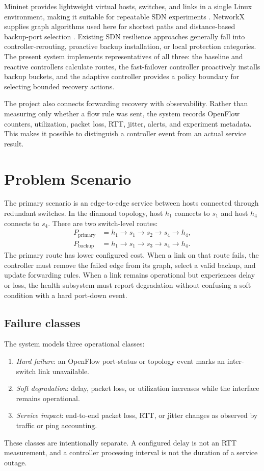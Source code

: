 \documentclass[conference]{IEEEtran}
\begin{document}
Mininet provides lightweight virtual hosts, switches, and links in a single
Linux environment, making it suitable for repeatable SDN experiments
\cite{lantz2010}. NetworkX supplies graph algorithms used here for shortest
paths and distance-based backup-port selection \cite{networkx}. Existing SDN
resilience approaches generally fall into controller-rerouting, proactive
backup installation, or local protection categories. The present system
implements representatives of all three: the baseline and reactive
controllers calculate routes, the fast-failover controller proactively
installs backup buckets, and the adaptive controller provides a policy
boundary for selecting bounded recovery actions.

The project also connects forwarding recovery with observability. Rather than
measuring only whether a flow rule was sent, the system records OpenFlow
counters, utilization, packet loss, RTT, jitter, alerts, and experiment
metadata. This makes it possible to distinguish a controller event from an
actual service result.

\section{Problem Scenario}
\label{sec:problem}

The primary scenario is an edge-to-edge service between hosts connected
through redundant switches. In the diamond topology, host $h_1$ connects to
$s_1$ and host $h_4$ connects to $s_4$. There are two switch-level routes:
\begin{align}
 P_{\mathrm{primary}} &= h_1\rightarrow s_1\rightarrow s_2
 \rightarrow s_4\rightarrow h_4,\\
 P_{\mathrm{backup}} &= h_1\rightarrow s_1\rightarrow s_3
 \rightarrow s_4\rightarrow h_4.
\end{align}
The primary route has lower configured cost. When a link on that route fails,
the controller must remove the failed edge from its graph, select a valid
backup, and update forwarding rules. When a link remains operational but
experiences delay or loss, the health subsystem must report degradation
without confusing a soft condition with a hard port-down event.

\subsection{Failure classes}

The system models three operational classes:
\begin{enumerate}
\item \textit{Hard failure}: an OpenFlow port-status or topology event marks
  an inter-switch link unavailable.
\item \textit{Soft degradation}: delay, packet loss, or utilization increases
  while the interface remains operational.
\item \textit{Service impact}: end-to-end packet loss, RTT, or jitter changes
  as observed by traffic or ping accounting.
\end{enumerate}
These classes are intentionally separate. A configured delay is not an RTT
measurement, and a controller processing interval is not the duration of a
service outage.
\end{document}
